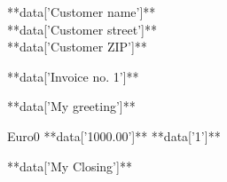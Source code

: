 \documentclass{letter}
\date{**data['23. May 2009']**}
\begin{document}
  \begin{letter}{**data['Customer name']** \\ **data['Customer street']** \\ **data['Customer ZIP']**}
    \opening{**data['Invoice no. 1']**}
    **data['My greeting']**
    \begin{invoice}{Euro}{0}
       {**data['1000.00']**} {**data['1']**}
    \end{invoice}
    \closing{**data['My Closing']**}
  \end{letter}
\end{document}
